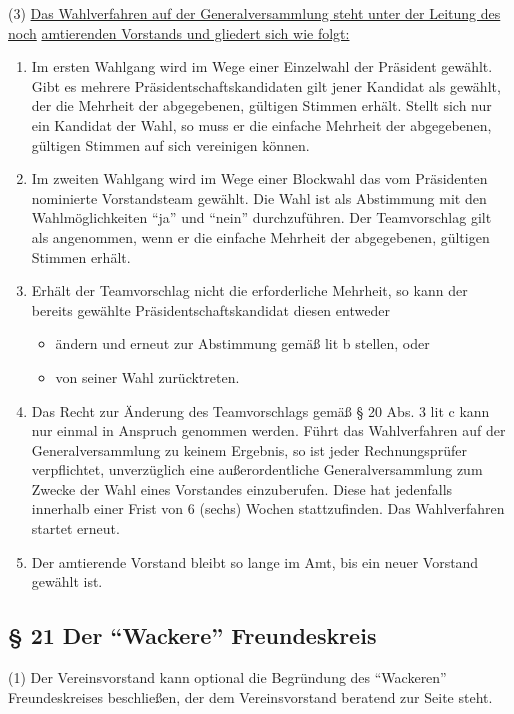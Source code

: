 \documentclass[11pt,a4paper]{article}
\begin{document}
(3)
\underline{Das Wahlverfahren auf der Generalversammlung steht unter der Leitung des noch}
\underline{amtierenden Vorstands und gliedert sich wie folgt:}

\begin{enumerate}[label=\alph*)]
\item
Im ersten Wahlgang wird im Wege einer Einzelwahl der Präsident gewählt.
Gibt es mehrere Präsidentschaftskandidaten gilt jener Kandidat als gewählt, der die Mehrheit der abgegebenen, gültigen Stimmen erhält.
Stellt sich nur ein Kandidat der Wahl, so muss er die einfache Mehrheit der abgegebenen, gültigen Stimmen auf sich vereinigen können.
\item
Im zweiten Wahlgang wird im Wege einer Blockwahl das vom Präsidenten nominierte Vorstandsteam gewählt.
Die Wahl ist als Abstimmung mit den Wahlmöglichkeiten "`ja"' und "`nein"' durchzuführen.
Der Teamvorschlag gilt als angenommen, wenn er die einfache Mehrheit der abgegebenen, gültigen Stimmen erhält.
\item
Erhält der Teamvorschlag nicht die erforderliche Mehrheit, so kann der bereits gewählte Präsidentschaftskandidat diesen entweder
	\begin{itemize}
	\renewcommand\labelitemi{-}
	\item
	ändern und erneut zur Abstimmung gemäß lit b stellen, oder
	\item
	von seiner Wahl zurücktreten.
	\end{itemize}
\item
Das Recht zur Änderung des Teamvorschlags gemäß § 20 Abs. 3 lit c kann nur einmal in Anspruch genommen werden.
Führt das Wahlverfahren auf der Generalversammlung zu keinem Ergebnis, so ist jeder Rechnungsprüfer verpflichtet, unverzüglich eine außerordentliche Generalversammlung zum Zwecke der Wahl eines Vorstandes einzuberufen.
Diese hat jedenfalls innerhalb einer Frist von 6 (sechs) Wochen stattzufinden.
Das Wahlverfahren startet erneut.
\item
Der amtierende Vorstand bleibt so lange im Amt, bis ein neuer Vorstand gewählt ist.
\end{enumerate}

\subsection{§ 21
Der "`Wackere"' Freundeskreis}

(1)
Der Vereinsvorstand kann optional die Begründung des "`Wackeren"' Freundeskreises beschließen, der dem Vereinsvorstand beratend zur Seite steht.
\end{document}

